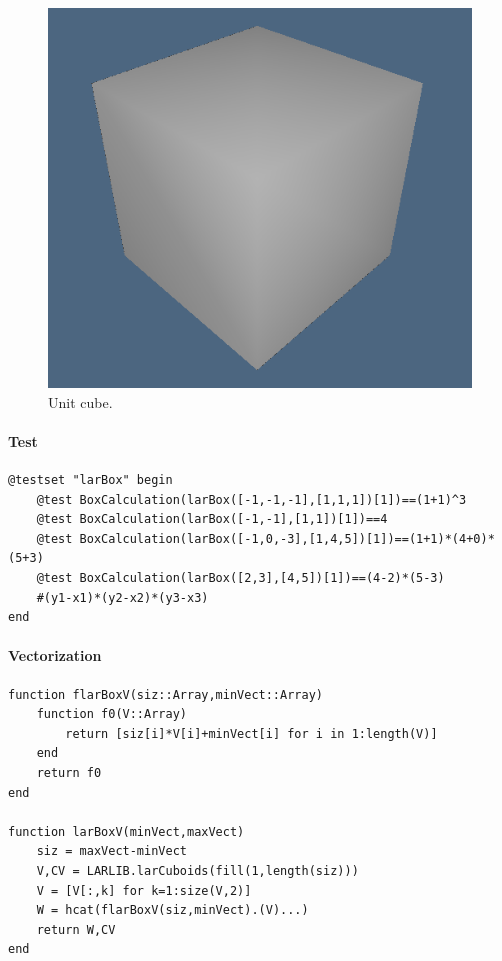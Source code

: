 \documentclass{article}
\begin{document}
\begin{figure}[htbp] 
\centering 
\includegraphics[scale=.35]{larBox.png} 
\caption{Unit cube.} 
\end{figure}

\paragraph{Test}
\begin{Verbatim}
@testset "larBox" begin
	@test BoxCalculation(larBox([-1,-1,-1],[1,1,1])[1])==(1+1)^3
	@test BoxCalculation(larBox([-1,-1],[1,1])[1])==4
	@test BoxCalculation(larBox([-1,0,-3],[1,4,5])[1])==(1+1)*(4+0)*(5+3)
	@test BoxCalculation(larBox([2,3],[4,5])[1])==(4-2)*(5-3)
	#(y1-x1)*(y2-x2)*(y3-x3)
end
\end{Verbatim}

\paragraph{Vectorization}

\begin{Verbatim}
function flarBoxV(siz::Array,minVect::Array)
    function f0(V::Array)
        return [siz[i]*V[i]+minVect[i] for i in 1:length(V)]
    end
    return f0
end

function larBoxV(minVect,maxVect)
    siz = maxVect-minVect
    V,CV = LARLIB.larCuboids(fill(1,length(siz)))
    V = [V[:,k] for k=1:size(V,2)]
    W = hcat(flarBoxV(siz,minVect).(V)...)
    return W,CV
end
\end{Verbatim}
\end{document}
